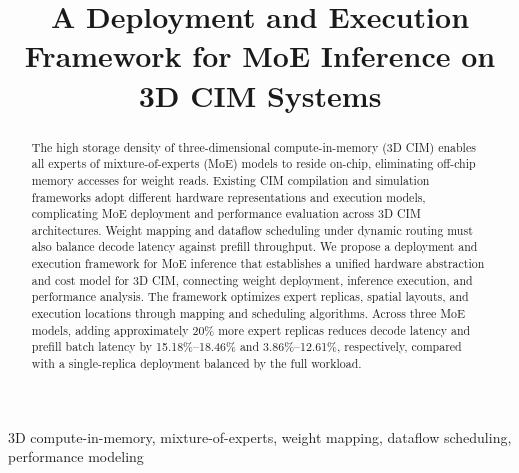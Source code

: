 \documentclass[conference,letterpaper,10pt]{IEEEtran}
\title{A Deployment and Execution Framework for MoE Inference on 3D CIM Systems}
\author{\IEEEauthorblockN{\strut}\IEEEauthorblockA{\strut\\\strut\\\strut}}
\begin{document}
\maketitle

\begin{abstract}
The high storage density of three-dimensional compute-in-memory (3D CIM) enables all experts of mixture-of-experts (MoE) models to reside on-chip, eliminating off-chip memory accesses for weight reads. Existing CIM compilation and simulation frameworks adopt different hardware representations and execution models, complicating MoE deployment and performance evaluation across 3D CIM architectures. Weight mapping and dataflow scheduling under dynamic routing must also balance decode latency against prefill throughput. We propose a deployment and execution framework for MoE inference that establishes a unified hardware abstraction and cost model for 3D CIM, connecting weight deployment, inference execution, and performance analysis. The framework optimizes expert replicas, spatial layouts, and execution locations through mapping and scheduling algorithms. Across three MoE models, adding approximately 20\% more expert replicas reduces decode latency and prefill batch latency by 15.18\%--18.46\% and 3.86\%--12.61\%, respectively, compared with a single-replica deployment balanced by the full workload.
\end{abstract}

\begin{IEEEkeywords}
3D compute-in-memory, mixture-of-experts, weight mapping, dataflow scheduling, performance modeling
\end{IEEEkeywords}







\clearpage


\end{document}
